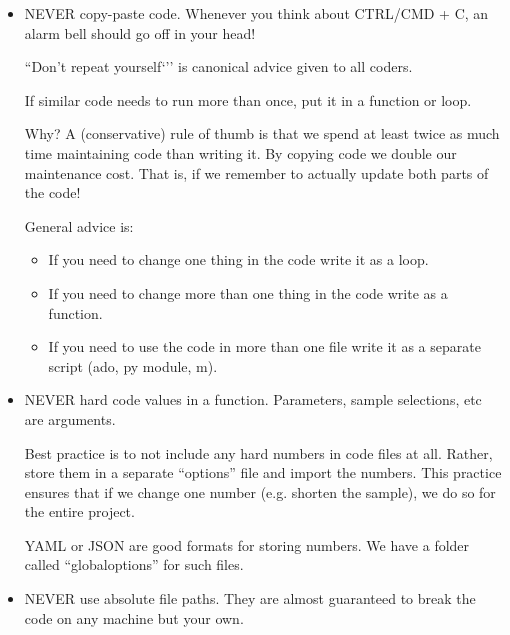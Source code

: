 \begin{itemize}
	\item NEVER copy-paste code. Whenever you think about CTRL/CMD + C, an alarm bell should go off in your head!
	
	``Don't repeat yourself`'' is canonical advice given to all coders.
	
	If similar code needs to run more than once, put it in a function or loop.
	
	Why? A (conservative) rule of thumb is that we spend at least twice as much time maintaining code than writing it. By copying code we double our maintenance cost. That is, if we remember to actually update both parts of the code!
	
	General advice is:
	\begin{itemize}
		\item If you need to change one thing in the code write it as a loop.
		\item If you need to change more than one thing in the code write as a function.
		\item If you need to use the code in more than one file write it as a separate script (ado, py module, m).
	\end{itemize}
	
	\item NEVER hard code values in a function. Parameters, sample selections, etc are arguments.
	
	Best practice is to not include any hard numbers in code files at all. Rather, store them in a separate ``options'' file and import the numbers. This practice ensures that if we change one number (e.g. shorten the sample), we do so for the entire project.
	
	YAML or JSON are good formats for storing numbers. We have a folder called ``globaloptions'' for such files.
	
	\item NEVER use absolute file paths. They are almost guaranteed to break the code on any machine but your own.
\end{itemize}
